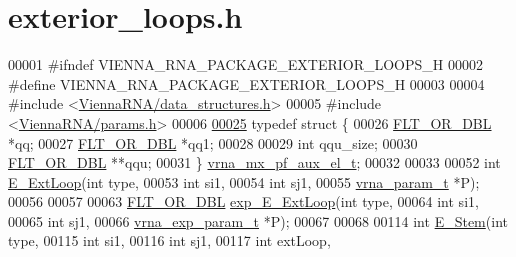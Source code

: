 \hypertarget{exterior__loops_8h_source}{}\section{exterior\+\_\+loops.\+h}
\label{exterior__loops_8h_source}

\begin{DoxyCode}
00001 \textcolor{preprocessor}{#ifndef VIENNA\_RNA\_PACKAGE\_EXTERIOR\_LOOPS\_H}
00002 \textcolor{preprocessor}{#define VIENNA\_RNA\_PACKAGE\_EXTERIOR\_LOOPS\_H}
00003 
00004 \textcolor{preprocessor}{#include <\hyperlink{data__structures_8h}{ViennaRNA/data\_structures.h}>}
00005 \textcolor{preprocessor}{#include <\hyperlink{params_8h}{ViennaRNA/params.h}>}
00006 
\hyperlink{group__loops}{00025} \textcolor{keyword}{typedef} \textcolor{keyword}{struct }\{
00026   \hyperlink{group__data__structures_ga31125aeace516926bf7f251f759b6126}{FLT\_OR\_DBL}  *qq;
00027   \hyperlink{group__data__structures_ga31125aeace516926bf7f251f759b6126}{FLT\_OR\_DBL}  *qq1;
00028 
00029   \textcolor{keywordtype}{int}         qqu\_size;
00030   \hyperlink{group__data__structures_ga31125aeace516926bf7f251f759b6126}{FLT\_OR\_DBL}  **qqu;
00031 \} \hyperlink{group__loops_structvrna__mx__pf__aux__el__t}{vrna\_mx\_pf\_aux\_el\_t};
00032 
00033 
00052 \textcolor{keywordtype}{int} \hyperlink{group__loops_ga05c6288c5a79d3bd5ad6d33c1bb34bd0}{E\_ExtLoop}(\textcolor{keywordtype}{int}           type,
00053               \textcolor{keywordtype}{int}           si1,
00054               \textcolor{keywordtype}{int}           sj1,
00055               \hyperlink{group__energy__parameters_structvrna__param__s}{vrna\_param\_t}  *P);
00056 
00057 
00063 \hyperlink{group__data__structures_ga31125aeace516926bf7f251f759b6126}{FLT\_OR\_DBL} \hyperlink{group__loops_ga446828a191c127861e76e2c84055f672}{exp\_E\_ExtLoop}(\textcolor{keywordtype}{int}              type,
00064                          \textcolor{keywordtype}{int}              si1,
00065                          \textcolor{keywordtype}{int}              sj1,
00066                          \hyperlink{group__energy__parameters_structvrna__exp__param__s}{vrna\_exp\_param\_t} *P);
00067 
00068 
00114 \textcolor{keywordtype}{int} \hyperlink{group__loops_ga51f9851f3500c2aae66674142a6a2dd5}{E\_Stem}(\textcolor{keywordtype}{int}          type,
00115            \textcolor{keywordtype}{int}          si1,
00116            \textcolor{keywordtype}{int}          sj1,
00117            \textcolor{keywordtype}{int}          extLoop,

\end{DoxyCode}
